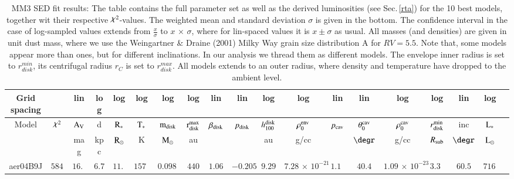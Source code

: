 \begin{appendix}
\begin{table}
\vspace*{9cm}
\caption[]{MM3 SED fit results: The table contains the full parameter set 
as well as the derived luminosities (see Sec.\,\ref{rta})
for the 10 best models, together wit their respective $\goodchi^2$-values. The weighted mean and standard deviation $\sigma$ is given in the bottom. The confidence interval in the case of log-sampled values extends from $\frac{x}{\sigma}$ to $x \,{\times}\, \sigma$, where for lin-spaced values it is $x \pm \sigma$ as usual. All masses (and densities) are given in unit dust mass, where we use the Weingartner \& Draine (2001) Milky Way grain size distribution A for $RV=5.5$. 
Note that, some models appear more than ones, but for different inclinations. In our analysis we thread them as different models. The envelope inner radius is set to $r_{disk}^{min}$, its centrifugal radius $r_C$ is set to $r_{disk}^{max}$. All models extends to an outer radius, where density and temperature have dropped to the ambient level. 
}
\label{tab MM3 fit} 
\begin{tabular}{ccccccccccccccccccc} 
\hline
Grid spacing &  & lin & log & log & log & log & log & lin & lin & log & log & lin & lin & log & log & lin & log\\ 
\hline 
Model & $\goodchi^2$ & $\rm A_V$ & d & $\rm R_*$ & $\rm T_*$ & $\rm m_{\rm disk}$  & $\rm r_{\rm disk}^{\rm max}$ & $\beta_{\rm disk}$ & $p_{\rm disk}$ & $h_{100}^{\rm disk}$ & $\rho_0^{\rm env}$ & $p_{\rm cav}$ & $\theta_0^{\rm cav}$ & $\rho_0^{\rm cav}$  & $r_{\rm disk}^{\rm min}$ & inc & $\rm L_*$\\ 
 &  & mag & kpc & ${\rm R}_\odot$ & K & ${\rm M}_\odot$ & au &  &  & au & g/cc &  & $\degr$  & g/cc & $R_{\rm sub}$ & $\degr$ & ${\rm L}_\odot$\\ 
\noalign{\smallskip} 
\hline 
\noalign{\smallskip} 
aer04B9J & $ 5842$ & $ 16.5$ & $ 6.75$ & $ 11.5$ & $ 15720$ & $ 0.0981$ & $ 440$ & $ 1.06$ & $ -0.205$ & $ 9.29$ & $ 7.28\,{\times}\, 10^{-21}$ & $ 1.16$ & $ 40.4$ & $ 1.09\,{\times}\, 10^{-23}$ & $ 3.35$ & $ 60.5$ & $ 7161$ \\ 

\end{tabular}
\end{table}
\end{appendix}
